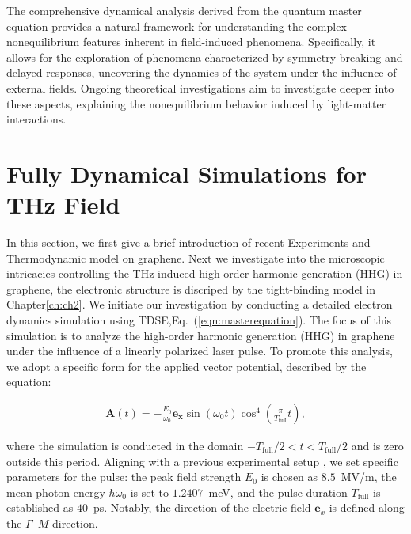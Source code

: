 The comprehensive dynamical analysis derived from the quantum master equation provides a natural framework for understanding the complex nonequilibrium features inherent in field-induced phenomena. Specifically, it allows for the exploration of phenomena characterized by symmetry breaking and delayed responses, uncovering the dynamics of the system under the influence of external fields. Ongoing theoretical investigations aim to investigate deeper into these aspects, explaining the nonequilibrium behavior induced by light-matter interactions.
\section{Fully Dynamical Simulations for THz Field}

In this section, we first give a brief introduction of recent Experiments and Thermodynamic model on
graphene. Next we investigate into the microscopic intricacies controlling the THz-induced high-order
harmonic generation (HHG) in graphene, the electronic structure is discriped by the tight-binding
model in Chapter\ref{ch:ch2}.
We initiate our investigation by conducting a detailed electron dynamics simulation using \gls{TDSE},Eq.~(\ref{eqn:masterequation}). The focus of this simulation is to analyze the high-order harmonic generation (HHG) in graphene under the influence of a linearly polarized laser pulse. To promote this analysis, we adopt a specific form for the applied vector potential, described by the equation:

\begin{align}
	\mathbf A(t) = -\frac{E_0}{\omega_0}\mathbf{e_x} \sin(\omega_0 t)\cos^4 \left (\frac{\pi}{T_\mathrm{full}} t \right),
	\label{eqn:laser_pulse}
\end{align}

where the simulation is conducted in the domain $-T_\mathrm{full}/2 < t < T_\mathrm{full}/2$ and is zero outside this period. Aligning with a previous experimental setup \cite{hafez2018extremely}, we set specific parameters for the pulse: the peak field strength $E_0$ is chosen as $8.5$~MV/m, the mean photon energy $\hbar \omega_0$ is set to $1.2407$~meV, and the pulse duration $T_{\mathrm{full}}$ is established as $40$~ps. Notably, the direction of the electric field $\mathbf e_x$ is defined along the $\Gamma$--$M$ direction.

